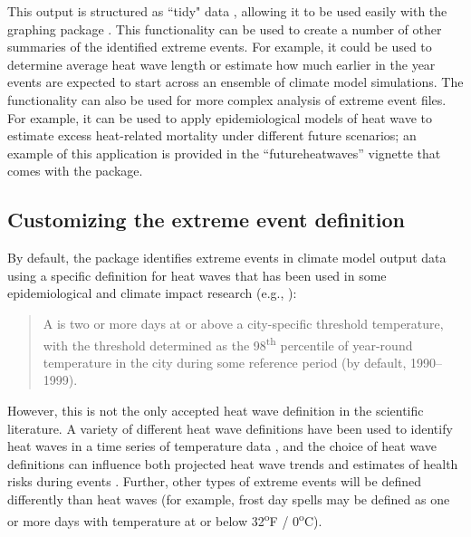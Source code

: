 This output is structured as ``tidy" data \citep{wickham2014tidy},
allowing it to be used easily with the graphing package
 \citep{ggplot2}. This functionality can be used to
create a number of other summaries of the identified extreme events. For
example, it could be used to determine average heat wave length or
estimate how much earlier in the year events are expected to start
across an ensemble of climate model simulations. The functionality can
also be used for more complex analysis of extreme event files. For
example, it can be used to apply epidemiological models of heat wave to
estimate excess heat-related mortality under different future scenarios;
an example of this application is provided in the ``futureheatwaves''
vignette that comes with the package.

\subsection{Customizing the extreme event
definition}\label{customizing-the-extreme-event-definition}

By default, the package identifies extreme events in climate model
output data using a specific definition for heat waves that has been
used in some epidemiological and climate impact research (e.g.,
\citet{anderson2009weather}):

\begin{quote}
A  is two or more days at or above a city-specific
threshold temperature, with the threshold determined as the
98\textsuperscript{th} percentile of year-round temperature in the city
during some reference period (by default, 1990--1999).
\end{quote}

\noindent However, this is not the only accepted heat wave definition in
the scientific literature. A variety of different heat wave definitions
have been used to identify heat waves in a time series of temperature
data
\citep{smith2013heat, kent2014heat, chen2015influence, anderson2009weather},
and the choice of heat wave definitions can influence both projected
heat wave trends \citep{smith2013heat} and estimates of health risks
during events
\citep{chen2015influence, kent2014heat, anderson2009weather}. Further,
other types of extreme events will be defined differently than heat
waves (for example, frost day spells may be defined as one or more days
with temperature at or below 32\textsuperscript{o}F /
0\textsuperscript{o}C).

